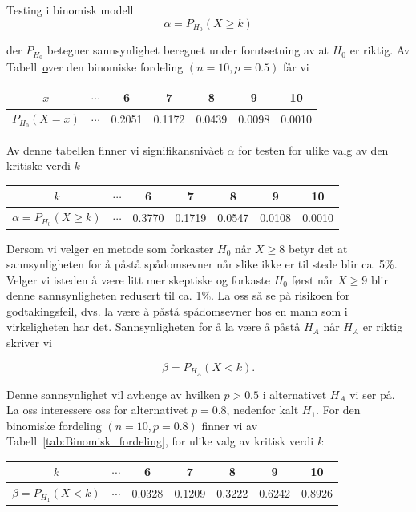 \begin{eksempel}{Testing i binomisk modell}
\[ \alpha = P_{H_0}(X\geq k) \]

\noindent der $P_{H_0}$ betegner sannsynlighet beregnet under forutsetning
av at $H_0$ er riktig. Av Tabell~\href{tab:Binomisk_fordeling_p05} over den binomiske fordeling
$(n=10, p=0.5)$ får vi

\begin{center}
\begin{tabular}{c|cccccc}
 $x$& $\cdots$ & 6 & 7 & 8 & 9 & 10 \\ \hline
 $P_{H_0}(X=x)$&$\cdots$&0.2051&0.1172&0.0439&0.0098&0.0010 
\end{tabular}
\end{center}
Av denne tabellen finner vi signifikansnivået $\alpha$ for
testen for ulike valg av den kritiske verdi $k$

\begin{center}
\begin{tabular}{c|cccccc}
 $k$& $\cdots$ & 6 & 7 & 8 & 9 & 10 \\ \hline
 $\alpha =P_{H_0}(X\geq k)$&$\cdots$&0.3770&0.1719&0.0547&0.0108&0.0010 
\end{tabular}
\end{center}

\noindent Dersom vi velger en metode som forkaster $H_0$ når $X\geq 8$
betyr det at sannsynligheten for å påstå spådomsevner når 
slike ikke er til stede blir ca. 5\%. Velger vi isteden å være litt mer
skeptiske og forkaste $H_0$ først når $X\geq 9$ blir denne
sannsynligheten redusert til ca. 1\%.
La oss så se på risikoen for godtakingsfeil, dvs. la være å
 påstå spådomsevner hos en mann som i virkeligheten har det.
Sannsynligheten for å la være å påstå $H_A$ når $H_A$
 er riktig skriver vi

\[ \beta=P_{H_A}(X < k). \]

\noindent Denne sannsynlighet vil avhenge av hvilken $p>0.5$ i alternativet
$H_A$ vi ser på. La oss interessere oss for alternativet $p=0.8$,
nedenfor kalt $H_1$. For den binomiske fordeling $(n=10, p=0.8)$
finner vi av Tabell~\ref{tab:Binomisk_fordeling}, for ulike valg av kritisk verdi $k$

\begin{center}
\begin{tabular}{c|cccccc}
 $k$& $\cdots$ & 6 & 7 & 8 & 9 & 10 \\ \hline
 $\beta =P_{H_1}(X < k)$&$\cdots$&0.0328&0.1209&0.3222&0.6242&0.8926 
\end{tabular}
\end{center}


\end{eksempel}
